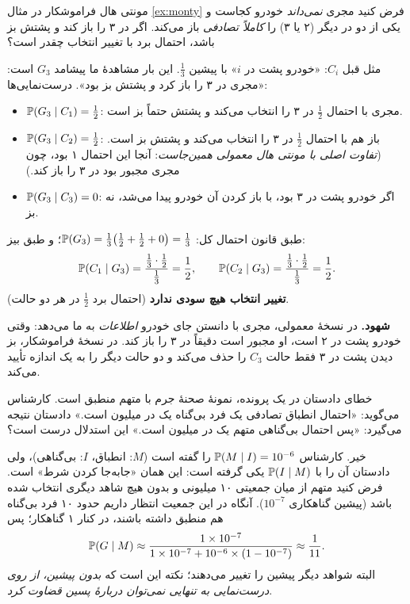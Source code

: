 \begin{example}[label=ex:monty-forget]{مونتی هال فراموشکار}
در مثال \ref{ex:monty} فرض کنید مجری \emph{نمی‌داند} خودرو کجاست و یکی از دو در دیگر (۲ یا ۳) را \emph{کاملاً تصادفی} باز می‌کند. اگر در ۳ را باز کند و پشتش بز باشد، احتمال برد با تغییر انتخاب چقدر است؟
\begin{solution}
مثل قبل $C_i$: «خودرو پشت در $i$» با پیشین $\tfrac13$. این بار مشاهدهٔ ما پیشامد $G_3$ است: «مجری در ۳ را باز کرد \emph{و} پشتش بز بود». درست‌نمایی‌ها:
\begin{itemize}
  \item $\P(G_3\mid C_1)=\tfrac12$: مجری با احتمال $\tfrac12$ در ۳ را انتخاب می‌کند و پشتش حتماً بز است.
  \item $\P(G_3\mid C_2)=\tfrac12$: باز هم با احتمال $\tfrac12$ در ۳ را انتخاب می‌کند و پشتش بز است. (\emph{تفاوت اصلی با مونتی هال معمولی همین‌جاست}: آنجا این احتمال ۱ بود، چون مجری مجبور بود در ۳ را باز کند.)
  \item $\P(G_3\mid C_3)=0$: اگر خودرو پشت در ۳ بود، با باز کردن آن خودرو پیدا می‌شد، نه بز.
\end{itemize}
طبق قانون احتمال کل: $\P(G_3)=\tfrac13\bigl(\tfrac12+\tfrac12+0\bigr)=\tfrac13$؛ و طبق بیز:
\[ \P(C_1\mid G_3)=\frac{\tfrac13\cdot\tfrac12}{\tfrac13}=\frac12,\qquad \P(C_2\mid G_3)=\frac{\tfrac13\cdot\tfrac12}{\tfrac13}=\frac12. \]
\textbf{تغییر انتخاب هیچ سودی ندارد} (احتمال برد $\tfrac12$ در هر دو حالت).

\textbf{شهود.} در نسخهٔ معمولی، مجری با دانستن جای خودرو \emph{اطلاعات} به ما می‌دهد: وقتی خودرو پشت در ۲ است، او مجبور است دقیقاً در ۳ را باز کند. در نسخهٔ فراموشکار، بز دیدن پشت در ۳ فقط حالت $C_3$ را حذف می‌کند و دو حالت دیگر را به یک اندازه تأیید می‌کند. 
\end{solution}
\end{example}

\begin{example}{خطای دادستان}
در یک پرونده، نمونهٔ  صحنهٔ جرم با  متهم منطبق است. کارشناس می‌گوید: «احتمال انطباق تصادفی یک فرد بی‌گناه یک در میلیون است.» دادستان نتیجه می‌گیرد: «پس احتمال بی‌گناهی متهم یک در میلیون است.» این استدلال درست است؟
\begin{solution}
خیر. کارشناس $\P(M\mid I)=10^{-6}$ را گفته است ($M$: انطباق، $I$: بی‌گناهی)، ولی دادستان آن را با $\P(I\mid M)$ یکی گرفته است: این همان «جابه‌جا کردن شرط» است. فرض کنید متهم از میان جمعیتی ۱۰ میلیونی و بدون هیچ شاهد دیگری انتخاب شده باشد (پیشین گناهکاری $10^{-7}$). آنگاه در این جمعیت انتظار داریم حدود ۱۰ فرد بی‌گناه هم  منطبق داشته باشند، در کنار ۱ گناهکار؛ پس
\[ \P(G\mid M)\approx\frac{1\times10^{-7}}{1\times10^{-7}+10^{-6}\times(1-10^{-7})}\approx\frac1{11}. \]
البته شواهد دیگر پیشین را تغییر می‌دهند؛ نکته این است که \emph{بدون پیشین، از روی درست‌نمایی به تنهایی نمی‌توان دربارهٔ پسین قضاوت کرد}.
\end{solution}
\end{example}

